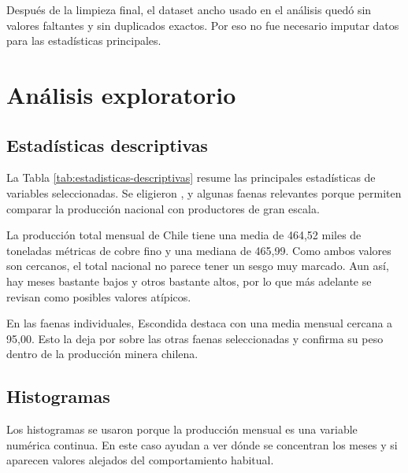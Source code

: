 \documentclass[11pt,letterpaper]{article}
\newcommand{\code}[1]{\texttt{\detokenize{#1}}}
\begin{document}
\begin{table}[H]
\centering
\caption{Principales valores faltantes antes del filtro final}
\label{tab:faltantes-original}

\end{table}

Después de la limpieza final, el dataset ancho usado en el análisis quedó sin valores faltantes y sin duplicados exactos. Por eso no fue necesario imputar datos para las estadísticas principales.

\section{Análisis exploratorio}

\subsection{Estadísticas descriptivas}

La Tabla \ref{tab:estadisticas-descriptivas} resume las principales estadísticas de variables seleccionadas. Se eligieron \code{total_chile}, \code{total_codelco} y algunas faenas relevantes porque permiten comparar la producción nacional con productores de gran escala.

\begin{table}[H]
\centering
\caption{Estadísticas descriptivas de variables seleccionadas}
\label{tab:estadisticas-descriptivas}

\end{table}

La producción total mensual de Chile tiene una media de 464,52 miles de toneladas métricas de cobre fino y una mediana de 465,99. Como ambos valores son cercanos, el total nacional no parece tener un sesgo muy marcado. Aun así, hay meses bastante bajos y otros bastante altos, por lo que más adelante se revisan como posibles valores atípicos.

En las faenas individuales, Escondida destaca con una media mensual cercana a 95,00. Esto la deja por sobre las otras faenas seleccionadas y confirma su peso dentro de la producción minera chilena.

\subsection{Histogramas}

Los histogramas se usaron porque la producción mensual es una variable numérica continua. En este caso ayudan a ver dónde se concentran los meses y si aparecen valores alejados del comportamiento habitual.
\end{document}
